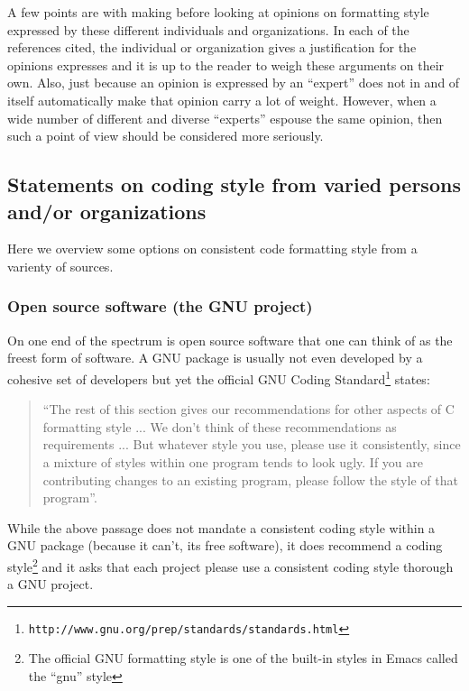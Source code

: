 A few points are with making before looking at opinions on formatting style
expressed by these different individuals and organizations.  In each of the
references cited, the individual or organization gives a justification for the
opinions expresses and it is up to the reader to weigh these arguments on
their own.  Also, just because an opinion is expressed by an ``expert'' does
not in and of itself automatically make that opinion carry a lot of weight.
However, when a wide number of different and diverse ``experts'' espouse the
same opinion, then such a point of view should be considered more seriously.

%
\subsection{Statements on coding style from varied persons and/or organizations}
%

Here we overview some options on consistent code formatting style from a
varienty of sources.

%
\subsubsection{Open source software (the GNU project)}
%

On one end of the spectrum is open source software that one can think of as
the freest form of software.  A GNU package is usually not even developed by a
cohesive set of developers but yet the official GNU Coding
Standard\footnote{{}\texttt{http://www.gnu.org/prep/standards/standards.html}}
states:

\begin{quote}

``The rest of this section gives our recommendations for other aspects of C
formatting style ... We don't think of these recommendations as requirements
... But whatever style you use, please use it consistently, since a mixture of
styles within one program tends to look ugly. If you are contributing changes
to an existing program, please follow the style of that program''.

\end{quote}

While the above passage does not mandate a consistent coding style within a
GNU package (because it can't, its free software), it does recommend a coding
style\footnote{The official GNU formatting style is one of the built-in styles
in Emacs called the ``gnu'' style} and it asks that each project please use a
consistent coding style thorough a GNU project.

